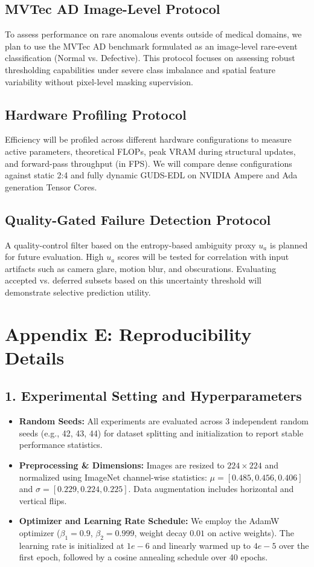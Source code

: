 \documentclass[letterpaper]{article} %
\begin{document}
\subsection{MVTec AD Image-Level Protocol}
To assess performance on rare anomalous events outside of medical domains, we plan to use the MVTec AD benchmark formulated as an image-level rare-event classification (Normal vs. Defective). This protocol focuses on assessing robust thresholding capabilities under severe class imbalance and spatial feature variability without pixel-level masking supervision.

\subsection{Hardware Profiling Protocol}
Efficiency will be profiled across different hardware configurations to measure active parameters, theoretical FLOPs, peak VRAM during structural updates, and forward-pass throughput (in FPS). We will compare dense configurations against static 2:4 and fully dynamic GUDS-EDL on NVIDIA Ampere and Ada generation Tensor Cores.

\subsection{Quality-Gated Failure Detection Protocol}
A quality-control filter based on the entropy-based ambiguity proxy $u_a$ is planned for future evaluation. High $u_a$ scores will be tested for correlation with input artifacts such as camera glare, motion blur, and obscurations. Evaluating accepted vs. deferred subsets based on this uncertainty threshold will demonstrate selective prediction utility.

\section{Appendix E: Reproducibility Details}

\subsection*{1. Experimental Setting and Hyperparameters}
\begin{itemize}
    \item \textbf{Random Seeds:} All experiments are evaluated across 3 independent random seeds (e.g., 42, 43, 44) for dataset splitting and initialization to report stable performance statistics.
    \item \textbf{Preprocessing \& Dimensions:} Images are resized to $224 \times 224$ and normalized using ImageNet channel-wise statistics: $\mu = [0.485, 0.456, 0.406]$ and $\sigma = [0.229, 0.224, 0.225]$. Data augmentation includes horizontal and vertical flips.
    \item \textbf{Optimizer and Learning Rate Schedule:} We employ the AdamW optimizer ($\beta_1=0.9$, $\beta_2=0.999$, weight decay $0.01$ on active weights). The learning rate is initialized at $1e-6$ and linearly warmed up to $4e-5$ over the first epoch, followed by a cosine annealing schedule over 40 epochs.
\end{itemize}
\end{document}
